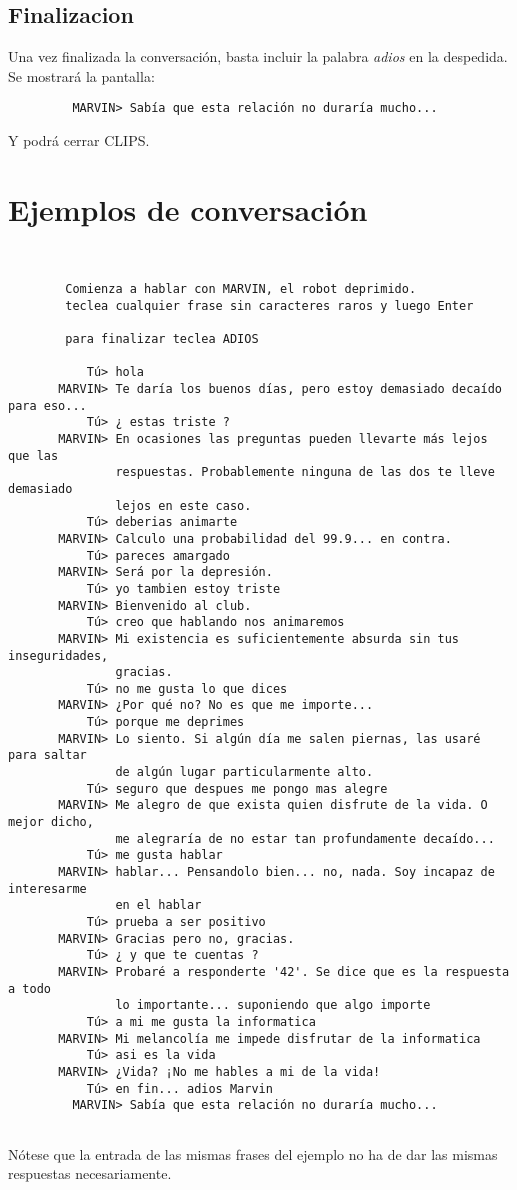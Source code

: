 \documentclass[a4paper]{article}
\begin{document}
		\subsection{Finalizacion}
		Una vez finalizada la conversación, basta incluir la palabra \emph{adios} en la despedida. Se mostrará la pantalla:
		\begin{verbatim}
         MARVIN> Sabía que esta relación no duraría mucho...
		\end{verbatim}	
		Y podrá cerrar CLIPS.
		
	\section{Ejemplos de conversación}
		\begin{verbatim}


        Comienza a hablar con MARVIN, el robot deprimido.
        teclea cualquier frase sin caracteres raros y luego Enter

        para finalizar teclea ADIOS 

           Tú> hola
       MARVIN> Te daría los buenos días, pero estoy demasiado decaído para eso...  
           Tú> ¿ estas triste ?
       MARVIN> En ocasiones las preguntas pueden llevarte más lejos que las
       	       respuestas. Probablemente ninguna de las dos te lleve demasiado
       	       lejos en este caso.
           Tú> deberias animarte
       MARVIN> Calculo una probabilidad del 99.9... en contra.
           Tú> pareces amargado
       MARVIN> Será por la depresión.
           Tú> yo tambien estoy triste
       MARVIN> Bienvenido al club.
           Tú> creo que hablando nos animaremos
       MARVIN> Mi existencia es suficientemente absurda sin tus inseguridades,
               gracias.
           Tú> no me gusta lo que dices
       MARVIN> ¿Por qué no? No es que me importe...
           Tú> porque me deprimes
       MARVIN> Lo siento. Si algún día me salen piernas, las usaré para saltar 
               de algún lugar particularmente alto.
           Tú> seguro que despues me pongo mas alegre
       MARVIN> Me alegro de que exista quien disfrute de la vida. O mejor dicho,
               me alegraría de no estar tan profundamente decaído...
           Tú> me gusta hablar
       MARVIN> hablar... Pensandolo bien... no, nada. Soy incapaz de interesarme
               en el hablar
           Tú> prueba a ser positivo
       MARVIN> Gracias pero no, gracias.
           Tú> ¿ y que te cuentas ?
       MARVIN> Probaré a responderte '42'. Se dice que es la respuesta a todo 
               lo importante... suponiendo que algo importe
           Tú> a mi me gusta la informatica
       MARVIN> Mi melancolía me impede disfrutar de la informatica
           Tú> asi es la vida
       MARVIN> ¿Vida? ¡No me hables a mi de la vida!
           Tú> en fin... adios Marvin
         MARVIN> Sabía que esta relación no duraría mucho...


		\end{verbatim}
		Nótese que la entrada de las mismas frases del ejemplo no ha de dar las mismas respuestas necesariamente.
\end{document}
